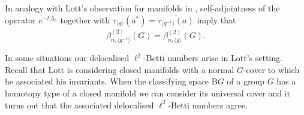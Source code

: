 \documentclass[a4paper,leqno,12pt]{article}
\numberwithin{equation}{section}
\theoremstyle{plain}
\theoremstyle{definition}
\theoremstyle{remark}
\newtheorem{remark}[theoremcounter]{Remark}
\begin{document}
	
	In analogy with Lott's observation for manifolds in \cite[Proposition 18]{lott1999}, self-adjointness of the operator $e^{-t\Delta_n}$ together with $\tau_{\langle g\rangle}(a^*) = \overline{{\tau_{\langle g^{-1}\rangle}{(a)}}}$ imply that 
	\[
	\beta ^{(2)}_{n, \langle g^{-1}\rangle}(G)=\overline{\beta ^{(2)}_{n, \langle g\rangle}(G)}.
	\]
	
		In some situations our delocalised $\ell^2$-Betti numbers arise in Lott's setting. Recall that Lott is considering closed manifolds with a normal $G$-cover to which he associated his invariants. When the classifying space $\mathrm{B}G$ of a group $G$ has a homotopy type of a closed manifold we can consider its universal cover and it turns out that the associated delocalised $\ell^2$-Betti numbers agree.
		
		
	
\end{document}
